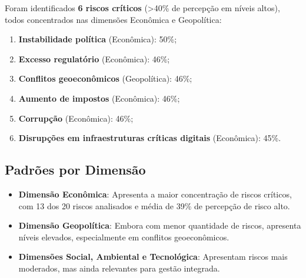 \documentclass[
  portuguese,
  letterpaper,
  DIV=11,
  numbers=noendperiod]{scrreprt}
\providecommand{\tightlist}{%
  \setlength{\itemsep}{0pt}\setlength{\parskip}{0pt}}
\begin{document}
\begin{tcolorbox}[enhanced jigsaw, breakable, leftrule=.75mm, opacitybacktitle=0.6, coltitle=black, rightrule=.15mm, colbacktitle=quarto-callout-important-color!10!white, colframe=quarto-callout-important-color-frame, titlerule=0mm, bottomtitle=1mm, colback=white, toprule=.15mm, toptitle=1mm, left=2mm, title=\textcolor{quarto-callout-important-color}{\faExclamation}\hspace{0.5em}{Riscos Críticos Identificados}, opacityback=0, bottomrule=.15mm, arc=.35mm]

Foram identificados \textbf{6 riscos críticos} (\textgreater40\% de
percepção em níveis altos), todos concentrados nas dimensões Econômica e
Geopolítica:

\begin{enumerate}
\def\labelenumi{\arabic{enumi}.}
\tightlist
\item
  \textbf{Instabilidade política} (Econômica): 50\%;
\item
  \textbf{Excesso regulatório} (Econômica): 46\%;
\item
  \textbf{Conflitos geoeconômicos} (Geopolítica): 46\%;
\item
  \textbf{Aumento de impostos} (Econômica): 46\%;
\item
  \textbf{Corrupção} (Econômica): 46\%;
\item
  \textbf{Disrupções em infraestruturas críticas digitais} (Econômica):
  45\%.
\end{enumerate}

\end{tcolorbox}

\subsection{Padrões por Dimensão}\label{padruxf5es-por-dimensuxe3o}

\begin{itemize}
\tightlist
\item
  \textbf{Dimensão Econômica}: Apresenta a maior concentração de riscos
  críticos, com 13 dos 20 riscos analisados e média de 39\% de percepção
  de risco alto.
\item
  \textbf{Dimensão Geopolítica}: Embora com menor quantidade de riscos,
  apresenta níveis elevados, especialmente em conflitos geoeconômicos.
\item
  \textbf{Dimensões Social, Ambiental e Tecnológica}: Apresentam riscos
  mais moderados, mas ainda relevantes para gestão integrada.
\end{itemize}
\end{document}
